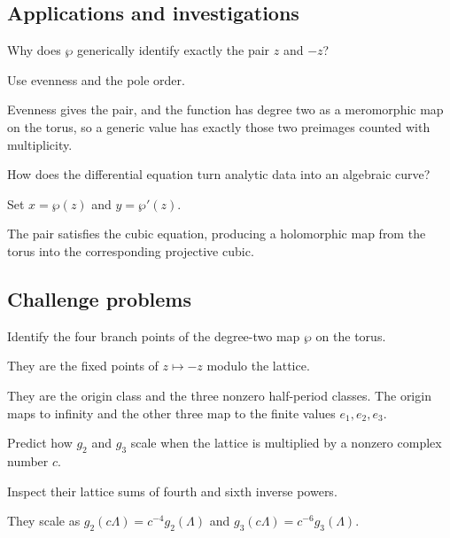 \subsection*{Applications and investigations}

\begin{exercise}\label{exr:iv29-expand-13}
Why does \(\wp\) generically identify exactly the pair \(z\) and \(-z\)?
\end{exercise}
\begin{hint}
Use evenness and the pole order.
\end{hint}
\begin{solution}
Evenness gives the pair, and the function has degree two as a meromorphic map on the torus, so a generic value has exactly those two preimages counted with multiplicity.
\end{solution}

\begin{exercise}\label{exr:iv29-expand-14}
How does the differential equation turn analytic data into an algebraic curve?
\end{exercise}
\begin{hint}
Set \(x=\wp(z)\) and \(y=\wp'(z)\).
\end{hint}
\begin{solution}
The pair satisfies the cubic equation, producing a holomorphic map from the torus into the corresponding projective cubic.
\end{solution}

\subsection*{Challenge problems}

\begin{exercise}\label{exr:iv29-expand-15}
Identify the four branch points of the degree-two map \(\wp\) on the torus.
\end{exercise}
\begin{hint}
They are the fixed points of \(z\mapsto-z\) modulo the lattice.
\end{hint}
\begin{solution}
They are the origin class and the three nonzero half-period classes. The origin maps to infinity and the other three map to the finite values \(e_1,e_2,e_3\).
\end{solution}

\begin{exercise}\label{exr:iv29-expand-16}
Predict how \(g_2\) and \(g_3\) scale when the lattice is multiplied by a nonzero complex number \(c\).
\end{exercise}
\begin{hint}
Inspect their lattice sums of fourth and sixth inverse powers.
\end{hint}
\begin{solution}
They scale as \(g_2(c\Lambda)=c^{-4}g_2(\Lambda)\) and \(g_3(c\Lambda)=c^{-6}g_3(\Lambda)\).
\end{solution}

